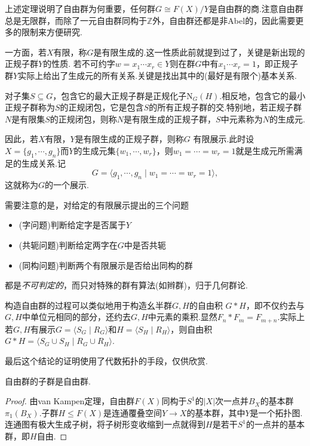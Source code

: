 上述定理说明了自由群为何重要，任何群$G\cong F(X)/Y$是自由群的商.注意自由群总是无限群，而除了一元自由群同构于$\mathbb{Z}$外，自由群还都是非Abel的，因此需要更多的限制来方便研究.

一方面，若$X$有限，称$G$是{\heiti 有限生成的}.这一性质此前就提到过了，关键是新出现的正规子群$Y$的性质.
若不可约字$w=x_1\cdots x_r\in Y$则在群$G$中有$x_1\cdots x_r=1$，即正规子群$Y$实际上给出了生成元的所有关系.关键是找出其中的(最好是有限个)基本关系.

对子集$S\subseteq G$，包含它的最大正规子群是正规化子$\mathrm{N}_G(H)$.相反地，包含它的最小正规子群称为$S$的{\heiti 正规闭包}，它是包含$S$的所有正规子群的交.特别地，若正规子群$N$是有限集$S$的正规闭包，则称$N$是{\heiti 有限生成的正规子群}，$S$中元素称为$N$的生成元.

因此，若$X$有限，$Y$是有限生成的正规子群，则称$G$ {\heiti 有限展示}.此时设$X=\{g_1,\cdots,g_n\}$而$Y$的生成元集$\{w_1,\cdots,w_r\}$，则$w_1=\cdots=w_r=1$就是生成元所需满足的{\heiti 生成关系}.记
\[
	G=\langle g_1,\cdots,g_n\mid w_1=\cdots=w_r=1\rangle ,
\]
这就称为$G$的一个{\heiti 展示}.
\begin{remark}
	需要注意的是，对给定的有限展示提出的三个问题
	\begin{itemize}
		\item (字问题)判断给定字是否属于$Y$
		\item (共轭问题)判断给定两字在$G$中是否共轭
		\item (同构问题)判断两个有限展示是否给出同构的群
	\end{itemize}
	都是\emph{不可判定的}，而只对特殊的群有算法(如辫群)，归于几何群论.
\end{remark}
\begin{remark}
	构造自由群的过程可以类似地用于构造幺半群$G,H$的{\heiti 自由积} $G*H$，即不仅约去与$G,H$中单位元相同的部分，还约去$G,H$中元素的乘积.显然$F_n*F_m=F_{m+n}$.实际上若$G,H$有展示$G=\langle S_G\mid R_G\rangle $和$H=\langle S_H\mid R_H\rangle $，则自由积$G*H=\langle S_G\cup S_H\mid R_G\cup R_H\rangle $.
\end{remark}

最后这个结论的证明使用了代数拓扑的手段，仅供欣赏.
\begin{thm}
	自由群的子群是自由群.
\end{thm}
\begin{proof}
	由van Kampen定理，自由群$F(X)$同构于$S^1$的$|X|$次一点并$B_X$的基本群$\pi_1(B_X)$.子群$H\le F(X)$是连通覆叠空间$Y\to X$的基本群，其中$Y$是一个拓扑图.连通图有极大生成子树，将子树形变收缩到一点就得到$H$是若干$S^1$的一点并的基本群，即$H$自由.
\end{proof}

